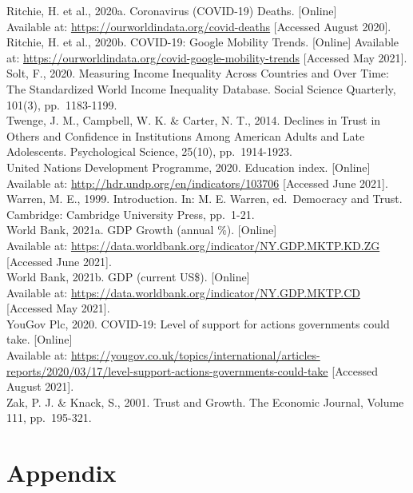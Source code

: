 \documentclass[
  11pt,
]{article}
\begin{document}
Ritchie, H. et al., 2020a. Coronavirus (COVID-19) Deaths. {[}Online{]}\\
Available at: \url{https://ourworldindata.org/covid-deaths} {[}Accessed August 2020{]}.\\
Ritchie, H. et al., 2020b. COVID-19: Google Mobility Trends. {[}Online{]}
Available at: \url{https://ourworldindata.org/covid-google-mobility-trends} {[}Accessed May 2021{]}.\\
Solt, F., 2020. Measuring Income Inequality Across Countries and Over Time: The Standardized World Income Inequality Database. Social Science Quarterly, 101(3), pp.~1183-1199.\\
Twenge, J. M., Campbell, W. K. \& Carter, N. T., 2014. Declines in Trust in Others and Confidence in Institutions Among American Adults and Late Adolescents. Psychological Science, 25(10), pp.~1914-1923.\\
United Nations Development Programme, 2020. Education index. {[}Online{]}\\
Available at: \url{http://hdr.undp.org/en/indicators/103706} {[}Accessed June 2021{]}.\\
Warren, M. E., 1999. Introduction. In: M. E. Warren, ed.~Democracy and Trust. Cambridge: Cambridge University Press, pp.~1-21.\\
World Bank, 2021a. GDP Growth (annual \%). {[}Online{]}\\
Available at: \url{https://data.worldbank.org/indicator/NY.GDP.MKTP.KD.ZG} {[}Accessed June 2021{]}.\\
World Bank, 2021b. GDP (current US\$). {[}Online{]}\\
Available at: \url{https://data.worldbank.org/indicator/NY.GDP.MKTP.CD} {[}Accessed May 2021{]}.\\
YouGov Plc, 2020. COVID-19: Level of support for actions governments could take. {[}Online{]}\\
Available at: \url{https://yougov.co.uk/topics/international/articles-reports/2020/03/17/level-support-actions-governments-could-take} {[}Accessed August 2021{]}.\\
Zak, P. J. \& Knack, S., 2001. Trust and Growth. The Economic Journal, Volume 111, pp.~195-321.\\

\newpage

\hypertarget{appendix}{%
\section*{Appendix}\label{appendix}}
\end{document}
